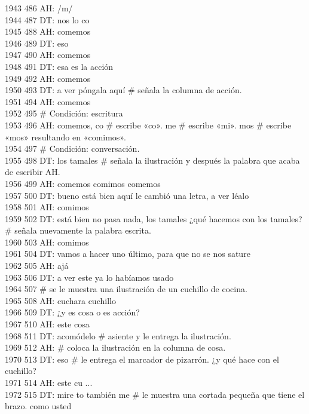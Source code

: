 1943 486 AH: /m/\\
1944 487 DT: nos lo co\\
1945 488 AH: comemos\\
1946 489 DT: eso\\
1947 490 AH: comemos\\
1948 491 DT: esa es la acción\\
1949 492 AH: comemos\\
1950 493 DT: a ver póngala aquí # señala la columna de acción.\\
1951 494 AH: comemos\\
1952 495 # Condición: escritura\\
1953 496 AH: comemos, co # escribe «co». me # escribe «mi». mos # escribe «mos» resultando en «comimos».\\
1954 497 # Condición: conversación.\\
1955 498 DT: los tamales # señala la ilustración y después la palabra que acaba de escribir AH.\\
1956 499 AH: comemos comimos comemos\\
1957 500 DT: bueno está bien aquí le cambió una letra, a ver léalo\\
1958 501 AH: comimos\\
1959 502 DT: está bien no pasa nada, los tamales ¿qué hacemos con los tamales? # señala nuevamente la palabra escrita.\\
1960 503 AH: comimos\\
1961 504 DT: vamos a hacer uno último, para que no se nos sature\\
1962 505 AH: ajá\\
1963 506 DT: a ver este ya lo habíamos usado\\
1964 507 # se le muestra una ilustración de un cuchillo de cocina.\\
1965 508 AH: cuchara cuchillo\\
1966 509 DT: ¿y es cosa o es acción?\\
1967 510 AH: este cosa\\
1968 511 DT: acomódelo # asiente y le entrega la ilustración.\\
1969 512 AH: # coloca la ilustración en la columna de cosa.\\
1970 513 DT: eso # le entrega el marcador de pizarrón. ¿y qué hace con el cuchillo?\\
1971 514 AH: este cu ...\\
1972 515 DT: mire to también me # le muestra una cortada pequeña que tiene el brazo. como usted\\
